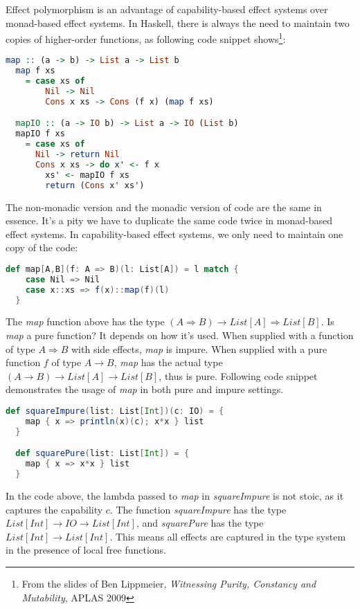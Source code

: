 Effect polymorphism is an advantage of capability-based effect systems
over monad-based effect systems. In Haskell, there is always the need
to maintain two copies of higher-order functions, as following code
snippet shows\footnote{From the slides of Ben Lippmeier,
  \emph{Witnessing Purity, Constancy and Mutability}, APLAS 2009}:

\begin{lstlisting}[language=Haskell]
  map :: (a -> b) -> List a -> List b
  map f xs
    = case xs of
        Nil -> Nil
        Cons x xs -> Cons (f x) (map f xs)

  mapIO :: (a -> IO b) -> List a -> IO (List b)
  mapIO f xs
    = case xs of
      Nil -> return Nil
      Cons x xs -> do x' <- f x
        xs' <- mapIO f xs
        return (Cons x' xs')
\end{lstlisting}

The non-monadic version and the monadic version of code are the same
in essence. It's a pity we have to duplicate the same code twice in
monad-based effect systems. In capability-based effect systems, we
only need to maintain one copy of the code:

\begin{lstlisting}[language=Scala]
  def map[A,B](f: A => B)(l: List[A]) = l match {
    case Nil => Nil
    case x::xs => f(x)::map(f)(l)
  }
\end{lstlisting}

The \emph{map} function above has the type
$(A \Rightarrow B) \to List[A] \Rightarrow List[B]$. Is \emph{map} a
pure function? It depends on how it's used. When supplied with a
function of type $A \Rightarrow B$ with side effects, \emph{map} is
impure. When supplied with a pure function $f$ of type $A \to B$,
\emph{map} has the actual type $(A \to B) \to List [A] \to List[B]$,
thus is pure. Following code snippet demonstrates the usage of
\emph{map} in both pure and impure settings.

\begin{lstlisting}[language=Scala]
  def squareImpure(list: List[Int])(c: IO) = {
    map { x => println(x)(c); x*x } list
  }

  def squarePure(list: List[Int]) = {
    map { x => x*x } list
  }
\end{lstlisting}

In the code above, the lambda passed to \emph{map} in
\emph{squareImpure} is not stoic, as it captures the capability
$c$. The function \emph{squareImpure} has the type
$List[Int] \to IO \to List[Int]$, and \emph{squarePure} has the type
$List[Int] \to List[Int]$. This means all effects are captured in the
type system in the presence of local free functions.

